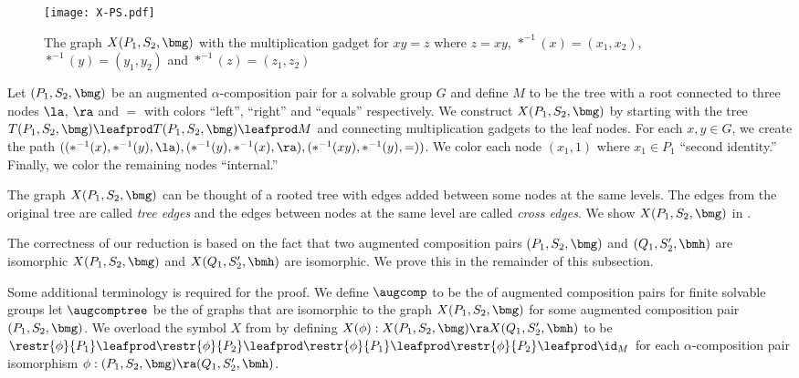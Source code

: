 \begin{figure}[H]
  \centering
  \texttt{[image: X-PS.pdf]}
  \caption{The graph $X(P_1, S_2, \bmg)$ with the multiplication gadget for $x y = z$ where $z = x y$, $*^{-1}(x) = (x_1, x_2)$, $*^{-1}(y) = (y_1, y_2)$ and $*^{-1}(z) = (z_1, z_2)$}
  \label{fig:X-PS}
\end{figure}


\begin{definition}
  \label{defn:X-PS}
  Let $(P_1, S_2, \bmg)$ be an augmented $\alpha$-composition pair for a solvable group $G$ and define $M$ to be the tree with a root connected to three nodes $\la$, $\ra$ and $=$ with colors ``left'', ``right'' and ``equals'' respectively.  We construct $X(P_1, S_2, \bmg)$ by starting with the tree $T(P_1, S_2, \bmg) \leafprod T(P_1, S_2, \bmg) \leafprod M$ and connecting multiplication gadgets to the leaf nodes.  For each $x, y \in G$, we create the path $((*^{-1}(x), *^{-1}(y), \la), (*^{-1}(y), *^{-1}(x), \ra), (*^{-1}(x y), *^{-1}(y), =))$.  We color each node $(x_1, 1)$ where $x_1 \in P_1$ ``second identity.''  Finally, we color the remaining nodes ``internal.''

\end{definition}

The graph $X(P_1, S_2, \bmg)$ can be thought of a rooted tree with edges added between some nodes at the same levels.  The edges from the original tree are called \emph{tree edges} and the edges between nodes at the same level are called \emph{cross edges}.  We show $X(P_1, S_2, \bmg)$ in .

The correctness of our reduction is based on the fact that two augmented composition pairs $(P_1, S_2, \bmg)$ and $(Q_1, S_2', \bmh)$ are isomorphic \ifft $X(P_1, S_2, \bmg)$ and $X(Q_1, S_2', \bmh)$ are isomorphic.  We prove this in the remainder of this subsection.

Some additional terminology is required for the proof.  We define $\augcomp$ to be the \classorcat\spc of augmented composition pairs for finite solvable groups  let $\augcomptree$ be the \classorcat\spc of graphs that are isomorphic to the graph $X(P_1, S_2, \bmg)$ for some augmented composition pair $(P_1, S_2, \bmg)$.  We overload the symbol $X$ from  by defining $X(\phi) : X(P_1, S_2, \bmg) \ra X(Q_1, S_2', \bmh)$ to be $\restr{\phi}{P_1} \leafprod \restr{\phi}{P_2} \leafprod \restr{\phi}{P_1} \leafprod \restr{\phi}{P_2} \leafprod \id_M$ for each $\alpha$-composition pair isomorphism $\phi : (P_1, S_2, \bmg) \ra (Q_1, S_2', \bmh)$.

